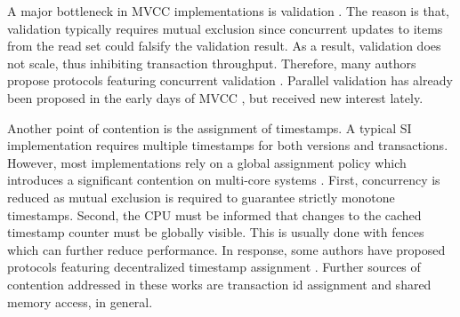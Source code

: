A major bottleneck in MVCC implementations is validation \cite{tu2013speedy,
bailey2013exploring, ding2015centiman, faleiro2015rethinking,
wang2017efficiently, zhou2017posterior}. The reason is that, validation
typically requires mutual exclusion since concurrent updates to items from the
read set could falsify the validation result. As a result, validation does not
scale, thus inhibiting transaction throughput. Therefore, many authors propose
protocols featuring concurrent validation \cite{bailey2013exploring,
ding2015centiman, faleiro2015rethinking, wang2017efficiently}. Parallel
validation has already been proposed in the early days of MVCC
\cite{kung1981optimistic}, but received new interest lately.

Another point of contention is the assignment of timestamps. A typical SI
implementation requires multiple timestamps for both versions and transactions.
However, most implementations rely on a global assignment policy which
introduces a significant contention on multi-core systems \cite{tu2013speedy,
zhou2017posterior}. First, concurrency is reduced as mutual exclusion is
required to guarantee strictly monotone timestamps. Second, the CPU must be
informed that changes to the cached timestamp counter must be globally visible.
This is usually done with fences which can further reduce performance. In
response, some authors have proposed protocols featuring decentralized timestamp
assignment \cite{tu2013speedy, zhou2017posterior}. Further sources of contention
addressed in these works are transaction id assignment and shared memory access,
in general.
